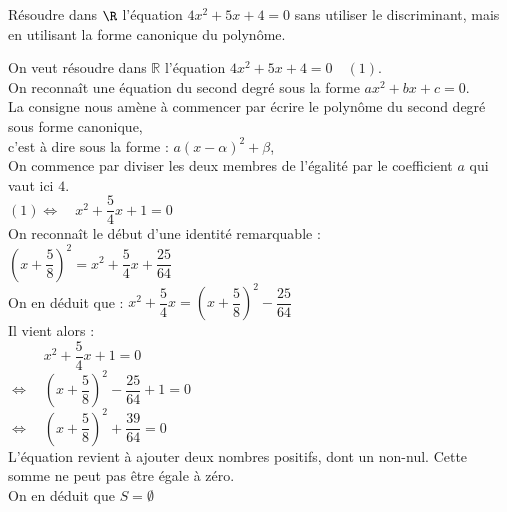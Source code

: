 \documentclass[a4paper,11pt,exos]{nsi} %
\begin{document}
\maketitle

\begin{exercice}%
    Résoudre dans $\R$ l'équation $4x^2+5x+4=0$ sans utiliser le discriminant, mais en utilisant la forme canonique du polynôme.
    
\end{exercice}

On veut résoudre dans $\mathbb{R}$ l'équation $4x^2+5x+4=0\quad(1)$.\\On reconnaît une équation du second degré sous la forme $ax^2+bx+c = 0$.\\La consigne nous amène à commencer par écrire le polynôme du second degré sous forme canonique, \\c'est à dire sous la forme :  $a(x-\alpha)^2+\beta$,\\On commence par diviser les deux membres de l'égalité par le coefficient $a$ qui vaut ici $4$.\\$(1)\iff\quad x^2 +\dfrac{5}{4} x +1=0$\\[.5em]On reconnaît le début d'une identité remarquable :\\$\left(x +\dfrac{5}{8}\right)^2=x^2 +\dfrac{5}{4}x+\dfrac{25}{64} $\\On en déduit que :  $x^2 +\dfrac{5}{4}x= \left(x +\dfrac{5}{8}\right)^2    -\dfrac{25}{64} $\\Il vient alors :\\$\phantom{\iff}\quad x^2 +\dfrac{5}{4} x +1=0$\\$\iff\quad  \left(x +\dfrac{5}{8}\right)^2    -\dfrac{25}{64}+1=0$\\$\iff\quad  \left(x +\dfrac{5}{8}\right)^2    +\dfrac{39}{64}=0$\\L'équation revient à ajouter deux nombres positifs, dont un non-nul. Cette somme ne peut pas être égale à zéro.\\On en déduit que $S=\emptyset$
\end{document}
